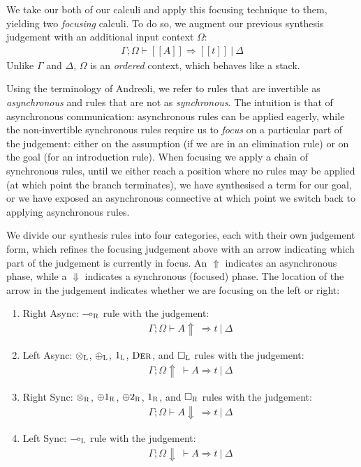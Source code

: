 We take our both of our calculi and apply this focusing technique to them,
yielding two \textit{focusing} calculi. To do so, we augment our previous
synthesis judgement with an additional input context $\Omega$:
\begin{align*}
\Gamma ; \Omega \vdash [[ A ]] \Rightarrow [[t ]]\ |\ \Delta
\end{align*}
Unlike $\Gamma$ and $\Delta$, $\Omega$ is an \textit{ordered} context, which 
behaves like a stack.

Using the terminology of Andreoli, we refer to rules that are invertible as
\textit{asynchronous} and rules that are not as
\textit{synchronous}. The intuition is that of asynchronous communication: 
asynchronous rules can be applied eagerly, while the non-invertible synchronous
rules require us to \textit{focus} on a particular part of the judgement: either
on the assumption (if we are in an elimination rule) or on the goal (for an
introduction rule). When focusing we apply a chain of synchronous rules, until
we either reach a position where no rules may be applied (at which point the
branch terminates), we have synthesised a term for our goal, or we have exposed
an asynchronous connective at which point we switch back to applying
asynchronous rules.

We divide our synthesis rules into four categories, each with their own
judgement form, which refines the focusing judgement above with an arrow
indicating which part of the judgement is currently in focus. An $\Uparrow$
indicates an asynchronous phase, while a $\Downarrow$ indicates a synchronous
(focused) phase. The location of the arrow in the judgement indicates whether we
are focusing on the left or right:
\begin{enumerate}
  \item Right Async: $\multimap_{\textsc{R}}$ rule with the judgement:
        \begin{align*}\Gamma ; \Omega \vdash A \Uparrow\ \Rightarrow t\ |\ \Delta \end{align*}
        \item Left Async:  $\otimes_{\textsc{L}}$, $\oplus_{\textsc{L}}$, $1_{\textsc{L}}$, $\textsc{Der}$, and $\Box_{\textsc{L}}$ rules with the judgement:
        \begin{align*}\Gamma ; \Omega \Uparrow\ \vdash A \Rightarrow t\ |\ \Delta \end{align*}
        \item Right Sync:  $\otimes_{\textsc{R}}$, $\oplus1_{\textsc{R}}$, $\oplus2_{\textsc{R}}$, $1_{\textsc{R}}$, and $\Box_{\textsc{R}}$ rules with the judgement:
        \begin{align*}\Gamma ; \Omega \vdash A \Downarrow\ \Rightarrow t\ |\ \Delta \end{align*}
        \item Left Sync:   $\multimap_{\textsc{L}}$ rule with the judgement:
        \begin{align*}\Gamma ; \Omega \Downarrow\ \vdash A \Rightarrow t\ |\ \Delta \end{align*}
\end{enumerate}

